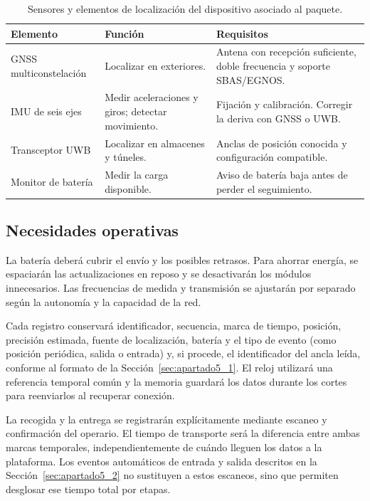 \documentclass[11pt,a4paper]{article}
\begin{document}
\begin{table}[H]
    \centering
    \footnotesize
    \renewcommand{\arraystretch}{1.15}
    \begin{tabular}{@{}L{3.7cm}L{5.1cm}L{5.8cm}@{}}
        \toprule
        \textbf{Elemento} & \textbf{Función} & \textbf{Requisitos} \\
        \midrule
        GNSS multiconstelación & Localizar en exteriores. & Antena con recepción suficiente, doble frecuencia y soporte SBAS/EGNOS. \\
        IMU de seis ejes & Medir aceleraciones y giros; detectar movimiento. & Fijación y calibración. Corregir la deriva con GNSS o UWB. \\
        Transceptor UWB & Localizar en almacenes y túneles. & Anclas de posición conocida y configuración compatible. \\
        Monitor de batería & Medir la carga disponible. & Aviso de batería baja antes de perder el seguimiento. \\
        \bottomrule
    \end{tabular}
    \caption{Sensores y elementos de localización del dispositivo asociado al paquete.}
    \label{tab:sensores}
\end{table}

\subsection{Necesidades operativas}
\label{sec:apartado4_2}

La batería deberá cubrir el envío y los posibles retrasos. Para ahorrar energía, se espaciarán las actualizaciones en reposo y se desactivarán los módulos innecesarios. Las frecuencias de medida y transmisión se ajustarán por separado según la autonomía y la capacidad de la red.

Cada registro conservará identificador, secuencia, marca de tiempo, posición, precisión estimada, fuente de localización, batería y el tipo de evento (como posición periódica, salida o entrada) y, si procede, el identificador del ancla leída, conforme al formato de la Sección~\ref{sec:apartado5_1}. El reloj utilizará una referencia temporal común y la memoria guardará los datos durante los cortes para reenviarlos al recuperar conexión.

La recogida y la entrega se registrarán explícitamente mediante escaneo y confirmación del operario. El tiempo de transporte será la diferencia entre ambas marcas temporales, independientemente de cuándo lleguen los datos a la plataforma. Los eventos automáticos de entrada y salida descritos en la Sección~\ref{sec:apartado5_2} no sustituyen a estos escaneos, sino que permiten desglosar ese tiempo total por etapas.
\end{document}

